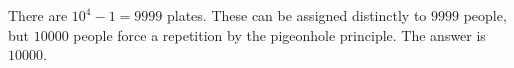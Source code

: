 There are $10^4-1=9999$ plates. These can be assigned distinctly to $9999$ people, but $10000$ people force a repetition by the pigeonhole principle. The answer is $\boxed{10000}$.
